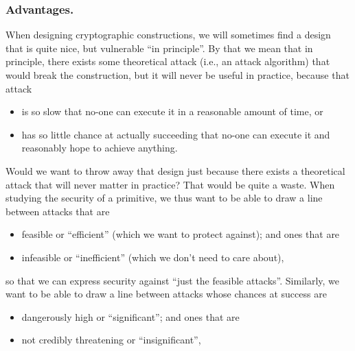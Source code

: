         
      \subsubsection{Advantages.}
        When designing cryptographic constructions, we will sometimes find a design that is quite nice, but vulnerable ``in principle''.
        By that we mean that in principle, there exists some theoretical attack (i.e., an attack algorithm) that would break the construction,
        but it will never be useful in practice, because that attack 
        \begin{itemize}
        	\item is so slow that no-one can execute it in a reasonable amount of time, or
        	\item  has so little chance at actually succeeding that no-one can execute it and reasonably hope to achieve anything.
        \end{itemize}
        Would we want to throw away that design just because there exists a theoretical attack that will never matter in practice?
        That would be quite a waste.
        When studying the security of a primitive, we thus want to be able to draw a line between attacks that are
        \begin{itemize}
        	\item feasible or ``efficient'' (which we want to protect against); and ones that are
        	\item infeasible or ``inefficient'' (which we don't need to care about),
        \end{itemize}
        so that we can express security against ``just the feasible attacks''.
        Similarly, we want to be able to draw a line between attacks whose chances at success are 
        \begin{itemize}
        	\item dangerously high or ``significant''; and ones that are
        	\item not credibly threatening or ``insignificant'',
        \end{itemize}
